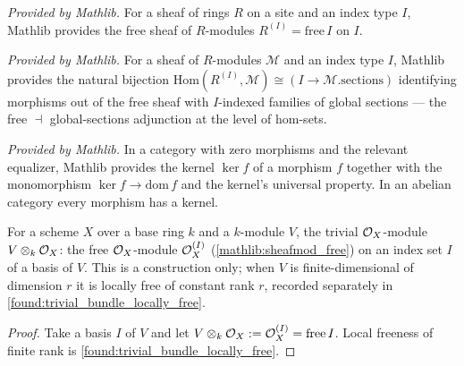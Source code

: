\begin{definition}
  \label{mathlib:sheafmod_free}
  \mathlibok
  \textit{Provided by Mathlib.}
  For a sheaf of rings \(R\) on a site and an index type \(I\), Mathlib provides the
  free sheaf of \(R\)-modules \(R^{(I)}=\mathrm{free}\,I\) on \(I\).
\end{definition}

\begin{lemma}
  \label{mathlib:sheafmod_freehomequiv}
  \mathlibok
  \textit{Provided by Mathlib.}
  For a sheaf of \(R\)-modules \(\mathcal M\) and an index type \(I\), Mathlib
  provides the natural bijection
  \(\mathrm{Hom}(R^{(I)},\mathcal M)\cong(I\to\mathcal M.\mathrm{sections})\)
  identifying morphisms out of the free sheaf with \(I\)-indexed families of global
  sections --- the free \(\dashv\) global-sections adjunction at the level of
  hom-sets.
\end{lemma}

\begin{definition}
  \label{mathlib:categorical_kernel}
  \mathlibok
  \textit{Provided by Mathlib.}
  In a category with zero morphisms and the relevant equalizer, Mathlib provides the
  kernel \(\ker f\) of a morphism \(f\) together with the monomorphism
  \(\ker f\to\mathrm{dom}\,f\) and the kernel's universal property.  In an abelian
  category every morphism has a kernel.
\end{definition}

\begin{definition}
  \label{found:trivial_bundle}
  For a scheme \(X\) over a base ring \(k\) and a \(k\)-module \(V\), the trivial
  \(\mathcal{O}_X\)-module \(V\otimes_k\mathcal{O}_X\): the free \(\mathcal{O}_X\)-module \(\mathcal{O}_X^{(I)}\)
  (\cref{mathlib:sheafmod_free}) on an index set \(I\) of a basis of \(V\).  This is
  a construction only; when \(V\) is finite-dimensional of dimension \(r\) it is
  locally free of constant rank \(r\), recorded separately in
  \cref{found:trivial_bundle_locally_free}.
\end{definition}

\begin{proof}
  \leanok
  Take a basis \(I\) of \(V\) and let \(V\otimes_k\mathcal{O}_X:=\mathcal{O}_X^{(I)}=\mathrm{free}\,I\).
  Local freeness of finite rank is \cref{found:trivial_bundle_locally_free}.
\end{proof}

